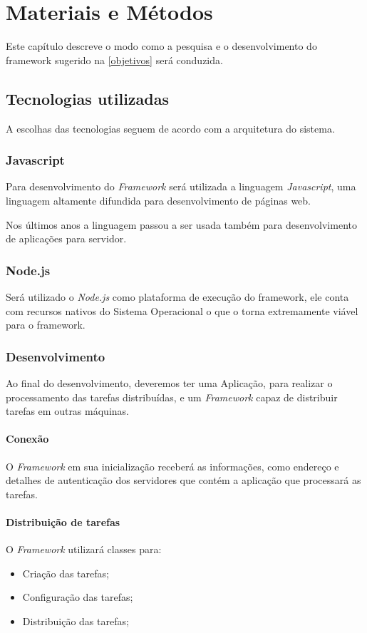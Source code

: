 
\chapter{Materiais e Métodos}
\label{metodologia}
Este capítulo descreve o modo como a pesquisa e o desenvolvimento do framework
 sugerido na \autoref{objetivos} será conduzida.

\section{Tecnologias utilizadas}
A escolhas das tecnologias seguem de acordo com a arquitetura do sistema.

\subsection{Javascript}
Para desenvolvimento do \emph{Framework} será utilizada a linguagem \emph{Javascript},
uma linguagem altamente difundida para desenvolvimento de páginas web.

Nos últimos anos a linguagem passou a ser usada também para desenvolvimento de
aplicações para servidor.

\subsection{Node.js}
Será utilizado o \emph{Node.js} como plataforma de execução do framework, ele
conta com recursos nativos do Sistema Operacional o que o torna extremamente
viável para o framework.

\subsection{Desenvolvimento}
Ao final do desenvolvimento, deveremos ter uma Aplicação, para realizar o
processamento das tarefas distribuídas, e um \emph{Framework} capaz de distribuir
tarefas em outras máquinas.


\subsubsection{Conexão}
O \emph{Framework} em sua inicialização receberá as informações, como
endere\c{c}o e detalhes de autenticação dos servidores que contém a aplicação que
processará as tarefas.

\subsubsection{Distribui\c{c}\~{a}o de tarefas}
O \emph{Framework} utilizará classes para:
\begin{itemize}
  \item Criação das tarefas;
  \item Configuração das tarefas;
  \item Distribuição das tarefas;
\end{itemize}
